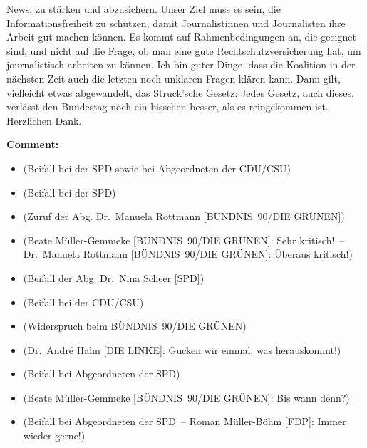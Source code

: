 \documentclass{article}
\begin{document}
News, zu stärken und abzusichern. Unser Ziel muss es sein, die Informationsfreiheit zu schützen, damit Journalistinnen und Journalisten ihre Arbeit gut machen können. Es kommt auf Rahmenbedingungen an, die geeignet sind, und nicht auf die Frage, ob man eine gute Rechtschutzversicherung hat, um journalistisch arbeiten zu können.  Ich bin guter Dinge, dass die Koalition in der nächsten Zeit auch die letzten noch unklaren Fragen klären kann.  Dann gilt, vielleicht etwas abgewandelt, das Struck’sche Gesetz: Jedes Gesetz, auch dieses, verlässt den Bundestag noch ein bisschen besser, als es reingekommen ist. Herzlichen Dank.  

\noindent\textbf{Comment:}
\begin{itemize}
    \setlength\itemsep{-3pt}
    \item (Beifall bei der SPD sowie bei Abgeordneten der CDU/CSU)
    \setlength\itemsep{-3pt}
    \item (Beifall bei der SPD)
    \setlength\itemsep{-3pt}
    \item (Zuruf der Abg. Dr. Manuela Rottmann [BÜNDNIS 90/DIE GRÜNEN])
    \setlength\itemsep{-3pt}
    \item (Beate Müller-Gemmeke [BÜNDNIS 90/DIE GRÜNEN]: Sehr kritisch! – Dr. Manuela Rottmann [BÜNDNIS 90/DIE GRÜNEN]: Überaus kritisch!)
    \setlength\itemsep{-3pt}
    \item (Beifall der Abg. Dr. Nina Scheer [SPD])
    \setlength\itemsep{-3pt}
    \item (Beifall bei der CDU/CSU)
    \setlength\itemsep{-3pt}
    \item (Widerspruch beim BÜNDNIS 90/DIE GRÜNEN)
    \setlength\itemsep{-3pt}
    \item (Dr. André Hahn [DIE LINKE]: Gucken wir einmal, was herauskommt!)
    \setlength\itemsep{-3pt}
    \item (Beifall bei Abgeordneten der SPD)
    \setlength\itemsep{-3pt}
    \item (Beate Müller-Gemmeke [BÜNDNIS 90/DIE GRÜNEN]: Bis wann denn?)
    \setlength\itemsep{-3pt}
    \item (Beifall bei Abgeordneten der SPD – Roman Müller-Böhm [FDP]: Immer wieder gerne!)
\end{itemize}
\end{document}
